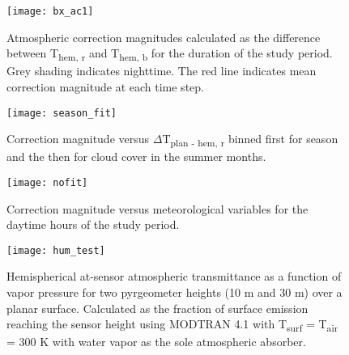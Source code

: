 \begin{bibunit}
\begin{figure}[H]
	\centering
	\texttt{[image: bx\_ac1]}
	\caption{Atmospheric correction magnitudes calculated as the difference between T\textsubscript{hem, r} and T\textsubscript{hem, b} for the duration of the study period. Grey shading indicates nighttime. The red line indicates mean correction magnitude at each time step.}
	\label{bx_ac}
\end{figure}

\begin{figure}[H]
	\centering
	\texttt{[image: season\_fit]}
	\caption{Correction magnitude versus $\Delta$T\textsubscript{plan - hem, r} binned first for season and the then for cloud cover in the summer months.}
	\label{season_fit}
\end{figure}

\begin{figure}[H]
	\centering
	\texttt{[image: nofit]}
	\caption{Correction magnitude versus meteorological variables for the daytime hours of the study period.}
	\label{nofit}
\end{figure}

\begin{figure}[H]
	\centering
	\texttt{[image: hum\_test]}
	\caption{Hemispherical at-sensor atmospheric transmittance as a function of vapor pressure for two pyrgeometer heights (10 \si{\meter} and 30 \si{\meter}) over a planar surface. Calculated as the fraction of surface emission reaching the sensor height using MODTRAN 4.1 with T\textsubscript{surf} = T\textsubscript{air} = 300 \si{\kelvin} with water vapor as the sole atmospheric absorber.}
	\label{humtest}
\end{figure}



\end{bibunit}
